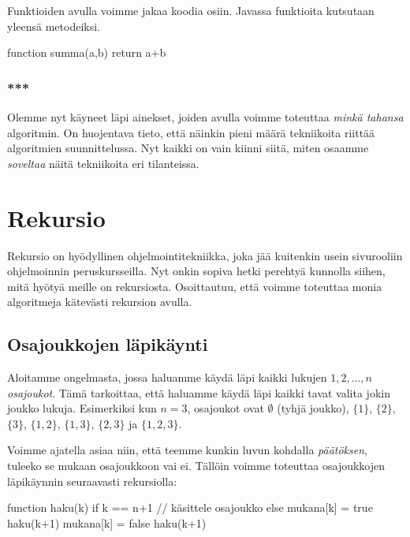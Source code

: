 Funktioiden avulla voimme jakaa koodia osiin.
Javassa funktioita kutsutaan yleensä metodeiksi.

\begin{code}
function summa(a,b)
    return a+b
\end{code}

\subsubsection{***}

Olemme nyt käyneet läpi ainekset,
joiden avulla voimme toteuttaa \emph{minkä tahansa} algoritmin.
On huojentava tieto, että näinkin pieni määrä tekniikoita
riittää algoritmien suunnittelussa.
Nyt kaikki on vain kiinni siitä, miten osaamme \emph{soveltaa}
näitä tekniikoita eri tilanteissa.

\section{Rekursio}


Rekursio on hyödyllinen ohjelmointitekniikka,
joka jää kuitenkin usein sivurooliin ohjelmoinnin peruskursseilla.
Nyt onkin sopiva hetki perehtyä kunnolla siihen,
mitä hyötyä meille on rekursiosta.
Osoittautuu, että voimme toteuttaa monia algoritmeja
kätevästi rekursion avulla.

\subsection{Osajoukkojen läpikäynti}


Aloitamme ongelmasta, jossa haluamme käydä läpi
kaikki lukujen $1,2,\dots,n$ \emph{osajoukot}.
Tämä tarkoittaa, että haluamme käydä läpi kaikki tavat
valita jokin joukko lukuja.
Esimerkiksi kun $n=3$, osajoukot ovat
$\emptyset$ (tyhjä joukko), $\{1\}$, $\{2\}$, $\{3\}$,
$\{1,2\}$, $\{1,3\}$, $\{2,3\}$ ja $\{1,2,3\}$.

Voimme ajatella asiaa niin, että teemme kunkin luvun
kohdalla \emph{päätöksen}, tuleeko se mukaan osajoukkoon vai ei.
Tällöin voimme toteuttaa osajoukkojen läpikäynnin
seuraavasti rekursiolla:

\begin{code}
function haku(k)
    if k == n+1
        // käsittele osajoukko
    else
        mukana[k] = true
        haku(k+1)
        mukana[k] = false
        haku(k+1)
\end{code}


